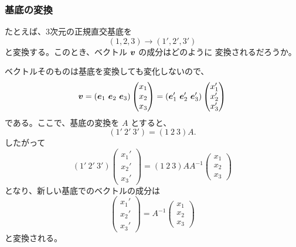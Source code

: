 \subsubsection{基底の変換}

たとえば、3次元の正規直交基底を
\[
 (\unit{1},\unit{2},\unit{3})
 \longrightarrow(\unit{1}',\unit{2}',\unit{3}')
\]
と変換する。このとき、ベクトル $\bm{v}$ の成分はどのように
変換されるだろうか。

ベクトルそのものは基底を変換しても変化しないので、
\begin{equation}
 \bm{v}
 =(\bm{e}_{1}\ \bm{e}_{2}\ \bm{e}_{3})
  \begin{pmatrix}x_1\\x_2\\x_3\end{pmatrix}
 =(\bm{e}_{1}'\ \bm{e}_{2}'\ \bm{e}_{3}')
  \begin{pmatrix}x_1'\\x_2'\\x_3'\end{pmatrix}
\end{equation}
である。ここで、基底の変換を $A$ とすると、
\[
 (\unit{1}'\ \unit{2}'\ \unit{3}')
 =(\unit{1}\ \unit{2}\ \unit{3})A.
\]
したがって
\[
 (\unit{1}'\ \unit{2}'\ \unit{3}')
 \begin{pmatrix}x_1'\\x_2'\\x_3'\end{pmatrix}
 =(\unit{1}\ \unit{2}\ \unit{3})AA^{-1}
 \begin{pmatrix}x_1\\x_2\\x_3\end{pmatrix}
\]
となり、新しい基底でのベクトルの成分は
\begin{equation}
 \boxed{
 \begin{pmatrix}x_1'\\x_2'\\x_3'\end{pmatrix}
 =A^{-1}\begin{pmatrix}x_1\\x_2\\x_3\end{pmatrix}}
\end{equation}
と変換される。

